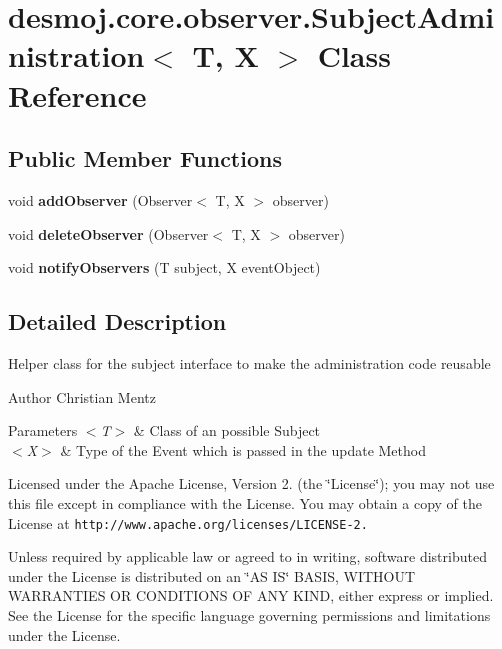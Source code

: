 \section{desmoj.\-core.\-observer.\-Subject\-Administration$<$ T, X $>$ Class Reference}
\label{classdesmoj_1_1core_1_1observer_1_1_subject_administration_3_01_t_00_01_x_01_4}
\subsection*{Public Member Functions}
\begin{DoxyCompactItemize}
\item 
void {\bf add\-Observer} (Observer$<$ T, X $>$ observer)
\item 
void {\bf delete\-Observer} (Observer$<$ T, X $>$ observer)
\item 
void {\bf notify\-Observers} (T subject, X event\-Object)
\end{DoxyCompactItemize}


\subsection{Detailed Description}
Helper class for the subject interface to make the administration code reusable

\begin{DoxyAuthor}{Author}
Christian Mentz
\end{DoxyAuthor}

\begin{DoxyParams}{Parameters}
{\em $<$\-T$>$} & Class of an possible Subject \\
\hline
{\em $<$\-X$>$} & Type of the Event which is passed in the update Method\\
\hline
\end{DoxyParams}
Licensed under the Apache License, Version 2. (the \char`\"{}\-License\char`\"{}); you may not use this file except in compliance with the License. You may obtain a copy of the License at {\tt http\-://www.\-apache.\-org/licenses/\-L\-I\-C\-E\-N\-S\-E-\/2.}

Unless required by applicable law or agreed to in writing, software distributed under the License is distributed on an \char`\"{}\-A\-S I\-S\char`\"{} B\-A\-S\-I\-S, W\-I\-T\-H\-O\-U\-T W\-A\-R\-R\-A\-N\-T\-I\-E\-S O\-R C\-O\-N\-D\-I\-T\-I\-O\-N\-S O\-F A\-N\-Y K\-I\-N\-D, either express or implied. See the License for the specific language governing permissions and limitations under the License. 


